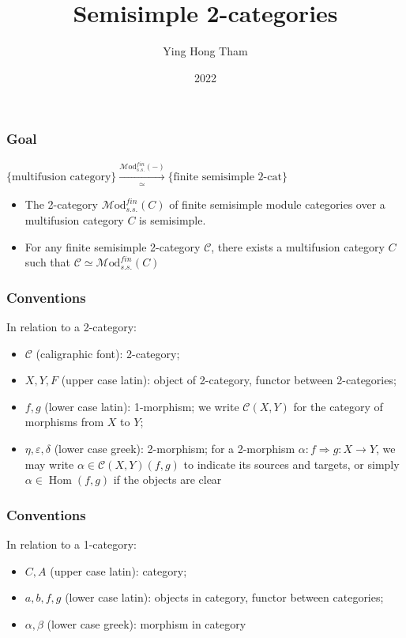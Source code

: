 \documentclass{beamer}
\title{Semisimple 2-categories}
\author{Ying Hong Tham}
\institute{UHH}
\date{2022}
\newcommand{\veps}{{\varepsilon}}
\DeclareMathOperator{\Hom}{Hom} %
\newcommand{\cC}{{\mathcal{C}}}
\newcommand{\Mod}{{\mathcal{M}\textrm{od}}}
\begin{document}
\frame{\titlepage}

\begin{frame}
\frametitle{Goal}
$\{\text{multifusion category}\}
\xrightarrow[\simeq]{\Mod_{s.s.}^{fin}(-)}
\{\text{finite semisimple 2-cat}\}$
\\

\begin{itemize}
\item The 2-category $\Mod_{s.s.}^{fin}(C)$
of finite semisimple module categories
over a multifusion category $C$
is semisimple.

\item For any finite semisimple 2-category $\cC$,
there exists a multifusion category $C$ such that
$\cC \simeq \Mod_{s.s.}^{fin}(C)$
\end{itemize}
\end{frame}

\begin{frame}
\frametitle{Conventions}
In relation to a 2-category:
\begin{itemize}
\item $\cC$ (caligraphic font): 2-category;

\item $X,Y,F$ (upper case latin): object of 2-category,
	functor between 2-categories;

\item $f,g$ (lower case latin): 1-morphism;
	we write $\cC(X,Y)$ for the category of morphisms
	from $X$ to $Y$;

\item $\eta,\veps,\delta$ (lower case greek): 2-morphism;
	for a 2-morphism $\alpha: f \Rightarrow g: X \to Y$,
	we may write $\alpha \in \cC(X,Y)(f,g)$
	to indicate its sources and targets,
	or simply $\alpha \in \Hom(f,g)$ if the objects are clear
\end{itemize}

\end{frame}


\begin{frame}
\frametitle{Conventions}
In relation to a 1-category:
\begin{itemize}
\item $C,A$ (upper case latin): category;

\item $a,b,f,g$ (lower case latin): objects in category,
	functor between categories;

\item $\alpha,\beta$ (lower case greek): morphism in category
\end{itemize}

\end{frame}
\end{document}
